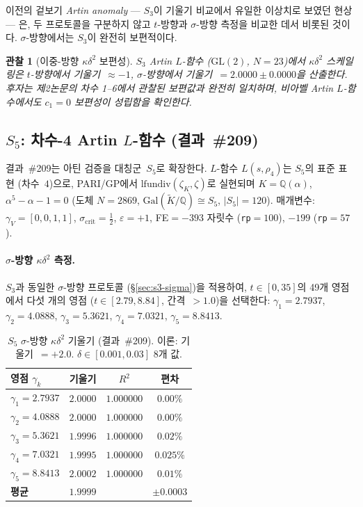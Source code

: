 \documentclass[11pt, a4paper]{article}
\theoremstyle{plain}
\newtheorem{observation}[theorem]{관찰}
\theoremstyle{definition}
\newcommand{\kap}{\kappa}             %
\begin{document}
이전의 겉보기 \emph{Artin anomaly} --- $S_{3}$이 기울기 비교에서 유일한
이상치로 보였던 현상 --- 은, 두 프로토콜을 구분하지 않고 $t$-방향과
$\sigma$-방향 측정을 비교한 데서 비롯된 것이다.
$\sigma$-방향에서는 $S_{3}$이 완전히 보편적이다.

\begin{observation}[이중-방향 $\kap\delta^{2}$ 보편성]
\label{obs:bidir}
$S_{3}$ Artin $L$-함수 ($\mathrm{GL}(2)$, $N=23$)에서
$\kap\delta^{2}$ 스케일링은 $t$-방향에서 기울기~$\approx{-1}$,
$\sigma$-방향에서 기울기~$=2.0000\pm0.0000$을 산출한다.
후자는 제2논문의 차수 1--6에서 관찰된 보편값과 완전히 일치하며,
비아벨 Artin $L$-함수에서도 $c_{1}=0$ 보편성이 성립함을 확인한다.
\end{observation}


\subsection{$S_{5}$: 차수-4 Artin $L$-함수 (결과~\#209)}
\label{sec:s5-results}

결과~\#209는 아틴 검증을 대칭군~$S_{5}$로 확장한다.
$L$-함수 $L(s,\rho_4)$는 $S_{5}$의 표준 표현 (차수~$4$)으로,
PARI/GP에서 $\mathrm{lfundiv}(\zeta_K,\zeta)$로 실현되며
$K=\mathbb{Q}(\alpha)$, $\alpha^{5}-\alpha-1=0$
(도체 $N=2869$, $\mathrm{Gal}(\tilde{K}/\mathbb{Q})\cong S_{5}$,
$|S_{5}|=120$). 매개변수: $\gamma_{V}=[0,0,1,1]$,
$\sigma_{\mathrm{crit}}=\tfrac{1}{2}$, $\varepsilon=+1$,
FE${}=-393$ 자릿수 (\texttt{rp}$=100$), $-199$ (\texttt{rp}$=57$).

\paragraph{$\sigma$-방향 $\kap\delta^{2}$ 측정.}
$S_{3}$과 동일한 $\sigma$-방향 프로토콜 (\S\ref{sec:s3-sigma})을 적용하여,
$t\in[0,35]$의 49개 영점에서 다섯 개의 영점
($t\in[2.79,8.84]$, 간격~$>1.0$)을 선택한다:
$\gamma_{1}=2.7937$, $\gamma_{2}=4.0888$,
$\gamma_{3}=5.3621$, $\gamma_{4}=7.0321$, $\gamma_{5}=8.8413$.

\begin{table}[ht]
\centering
\caption{$S_{5}$ $\sigma$-방향 $\kap\delta^{2}$ 기울기 (결과~\#209).
  이론: 기울기~$=+2.0$.  $\delta\in[0.001,0.03]$ 8개 값.}
\label{tab:s5-sigma}
\begin{tabular}{@{}lccc@{}}
\toprule
\textbf{영점 $\gamma_{k}$} & \textbf{기울기} & $R^{2}$ & \textbf{편차} \\
\midrule
$\gamma_{1}=2.7937$ & $2.0000$ & $1.000000$ & $0.00\%$ \\
$\gamma_{2}=4.0888$ & $2.0000$ & $1.000000$ & $0.00\%$ \\
$\gamma_{3}=5.3621$ & $1.9996$ & $1.000000$ & $0.02\%$ \\
$\gamma_{4}=7.0321$ & $1.9995$ & $1.000000$ & $0.025\%$ \\
$\gamma_{5}=8.8413$ & $2.0002$ & $1.000000$ & $0.01\%$ \\
\midrule
\textbf{평균} & $\bm{1.9999}$ & & $\pm\bm{0.0003}$ \\
\bottomrule
\end{tabular}
\end{table}
\end{document}
